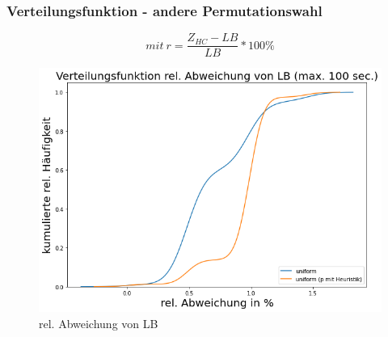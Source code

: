 \documentclass{beamer}
\begin{document}
\begin{frame}

\frametitle{Verteilungsfunktion - andere Permutationswahl}

\begin{footnotesize}
\begin{equation}
mit \ r = \frac{Z_{HC}-LB}{LB} * 100\%
\end{equation}
\end{footnotesize}

\begin{figure}[!htbp]
\begin{center}
\includegraphics[scale=0.3]{img/dist4.png}
\end{center}
\caption{rel. Abweichung von LB}
\label{fig:architecture}
\end{figure}



\end{frame}
\end{document}
